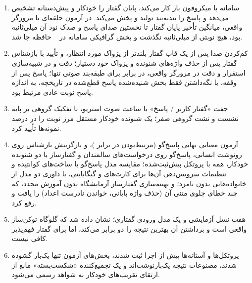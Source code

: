 \begin{enumerate}
\item {} سامانه با میکروفون باز
      کار می‌کند، پایان گفتار را خودکار و پیش‌دستانه تشخیص می‌دهد و پاسخ را
      بند‌به‌بند تولید و پخش می‌کند. در آزمون حلقه‌ای با مرورگر واقعی، میانگین
      تأخیر پایان گفتار تا نخستین صدای پاسخ  و صدک نود آن 
      میلی‌ثانیه بود، هیچ نوبتی از  میلی‌ثانیه نگذشت و بخش گرافیکی
      سامانه در ~ حافظه جا شد.

\item {} کم‌کردن صدا پس از یک قاب
      گفتار بلندتر از پژواک مورد انتظار، و تأیید با بازشناس گفتار پس از حذف
      واژه‌های شنونده و پژواک خود دستیار؛ دقت  و  
      در شبیه‌سازی استقرار و دقت  در مرورگر واقعی، در برابر
       برای طبقه‌بند صوتی تنها؛ پاسخ پس از وقفه، با نگه‌داشتن فقط
      بخش شنیده‌شده پاسخ قطع‌شده در تاریخچه، به اندازه پاسخ نوبت عادی مرتبط بود.

\item {}  جفت
      «گفتار کاربر / پاسخ» با  ساعت صوت استریو، با تفکیک گروهی بر
      پایه نشست و نشت گروهی صفر؛ یک شنونده خودکار مستقل مرز نوبت را در
       درصد نمونه‌ها تأیید کرد.

\item {} آزمون معنایی نهایی پاسخ‌گو (مرتبط‌بودن
       در برابر )، و بازگزینش بازشناس روی رونوشت انسانی، پاسخ‌گو
      روی درخواست‌های سالمندان و گفتارساز با دو شنونده خودکار، همه با پروتکل
      پیش‌ثبت‌شده؛ مقایسه  مدل پاسخ‌گو با ساخت‌های کوانتیده و تنظیمات
      سرویس‌دهی آن‌ها برای کارت‌های  و  گیگابایتی، با داوری دو مدل از
      خانواده‌هایی بدون نامزد؛ و بهینه‌سازی گفتارساز آزمایشگاه بدون آموزش مجدد، که چند خطای
      جلوی متنی آن (حذف واژه پایانی، خواندن نادرست اعداد) را یافت و رفع کرد.

\item {} هفت نسل آزمایشی  و
      یک مدل ورودی گفتاری؛ نشان داده شد که گلوگاه توکن‌ساز واقعی است و برداشتن آن
      بهترین نتیجه را دو برابر می‌کند، اما برای گفتار فهم‌پذیر کافی نیست.

\item {} پروتکل‌ها و آستانه‌ها پیش از اجرا ثبت
      شدند، بخش‌های آزمون تنها یک‌بار گشوده شدند، مصنوعات نتیجه یک‌بار‌نوشت‌اند و
      یک تجمیع‌کننده «شکست‌بسته» مانع از ارتقای تقریب‌های
      خودکار به شواهد رسمی می‌شود.
\end{enumerate}

